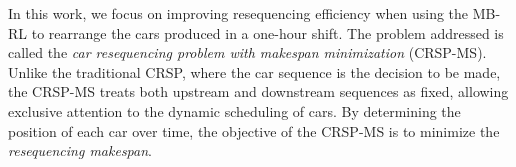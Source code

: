 \documentclass[12pt]{article}
\begin{document}



In this work, we focus on improving resequencing efficiency when using the MB-RL to rearrange the cars produced in a one-hour shift. The problem addressed is called the \textit{car resequencing problem with makespan minimization} (CRSP-MS). Unlike the traditional CRSP, where the car sequence is the decision to be made, the CRSP-MS treats both upstream and downstream sequences as fixed, allowing exclusive attention to the dynamic scheduling of cars. %
By determining the position of each car over time, the objective of the CRSP-MS is to minimize the \textit{resequencing makespan}.


\end{document}
